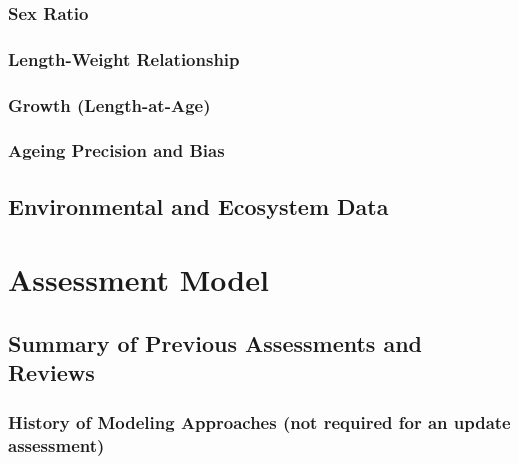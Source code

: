 \documentclass[11pt,
  english,
  letterpaper,
]{article}
\begin{document}
\hypertarget{sex-ratio}{%
\subsubsection{Sex Ratio}\label{sex-ratio}}

\hypertarget{length-weight-relationship}{%
\subsubsection{Length-Weight Relationship}\label{length-weight-relationship}}

\hypertarget{growth-length-at-age}{%
\subsubsection{Growth (Length-at-Age)}\label{growth-length-at-age}}

\hypertarget{ageing-precision-and-bias}{%
\subsubsection{Ageing Precision and Bias}\label{ageing-precision-and-bias}}

\hypertarget{environmental-and-ecosystem-data}{%
\subsection{Environmental and Ecosystem Data}\label{environmental-and-ecosystem-data}}

\hypertarget{assessment-model}{%
\section{Assessment Model}\label{assessment-model}}

\hypertarget{summary-of-previous-assessments-and-reviews}{%
\subsection{Summary of Previous Assessments and Reviews}\label{summary-of-previous-assessments-and-reviews}}

\hypertarget{history-of-modeling-approaches-not-required-for-an-update-assessment}{%
\subsubsection{History of Modeling Approaches (not required for an update assessment)}\label{history-of-modeling-approaches-not-required-for-an-update-assessment}}
\end{document}
